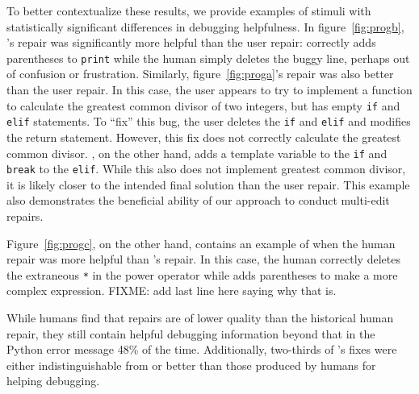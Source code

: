 To better contextualize these results, we provide examples of stimuli with
statistically significant differences in debugging helpfulness.
In figure~\ref{fig:progb}, \toolname's repair was
significantly more helpful than the user repair:
 \toolname correctly adds parentheses to \texttt{print}
while the human simply deletes the
buggy line, perhaps out of confusion or frustration.
Similarly, figure~\ref{fig:proga}'s \toolname repair was also
better than the user repair. In this case, the user appears to try to
implement a function to calculate the greatest common divisor of two integers,
but has empty \texttt{if} and \texttt{elif} statements.
To ``fix'' this bug, the user
deletes the \texttt{if} and \texttt{elif} and modifies the return statement.
However, this fix does not correctly calculate the greatest common divisor.
\toolname, on the other hand, adds a template variable to the \texttt{if} and
\texttt{break} to the \texttt{elif}. While this also does not implement
greatest common divisor, it is likely closer to the intended final solution
than the user repair. This example also demonstrates the beneficial ability of our approach
to conduct multi-edit repairs.

Figure~\ref{fig:progc}, on the other hand, contains an example of when the
human repair was more helpful than \toolname's repair. In this case, the
human correctly deletes the extraneous \texttt{*} in the power operator
while \toolname adds parentheses to make a more complex expression.
FIXME: add last line here saying why that is.

\begin{framed}
  \noindent
While humans find that \toolname repairs are
of lower quality than the historical human repair, they still contain helpful
debugging information beyond that in the Python error message 48\% of the time.
Additionally, two-thirds of \toolname's fixes were either indistinguishable from
or better than those produced by humans for helping debugging.
\end{framed}
